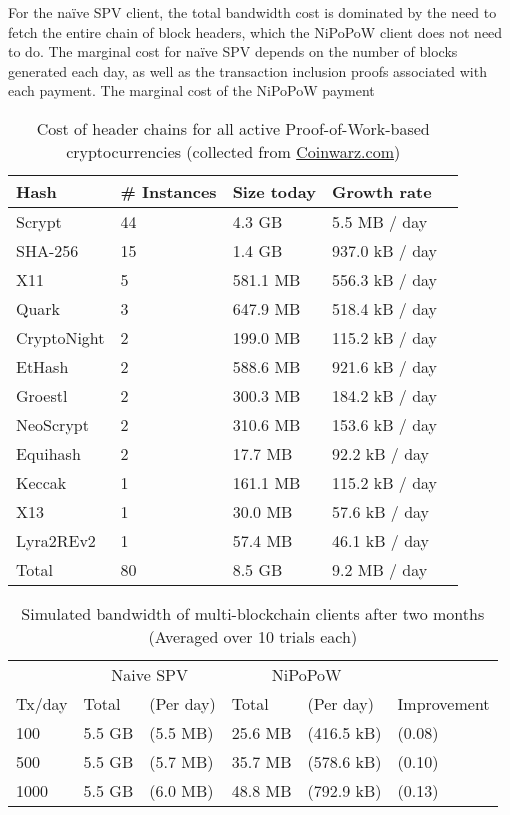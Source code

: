  For the na\"ive SPV client, the total bandwidth cost is dominated by the need to fetch the entire chain of block headers, which the NiPoPoW client does not need to do. The marginal cost for na\"ive SPV depends on the number of blocks generated each day, as well as the transaction inclusion proofs associated with each payment. The marginal cost of the NiPoPoW payment 

\begin{table}
  \caption{Cost of header chains for all active Proof-of-Work-based cryptocurrencies (collected from \url{Coinwarz.com})}
  \label{tbl:currencies}
\small
  \begin{tabular}{l|l|l|l}
    {\bf Hash} & {\bf \# Instances} & {\bf Size today} & {\bf Growth rate}  \\
    \hline
    Scrypt  & 44  & 4.3 GB  & 5.5 MB / day \  \\
    SHA-256  & 15  & 1.4 GB  & 937.0 kB / day \  \\
    X11  & 5  & 581.1 MB  & 556.3 kB / day \  \\
    Quark  & 3  & 647.9 MB  & 518.4 kB / day \  \\
    CryptoNight  & 2  & 199.0 MB  & 115.2 kB / day \  \\
    EtHash  & 2  & 588.6 MB  & 921.6 kB / day \  \\
    Groestl  & 2  & 300.3 MB  & 184.2 kB / day \  \\
    NeoScrypt  & 2  & 310.6 MB  & 153.6 kB / day \  \\
    Equihash  & 2  & 17.7 MB  & 92.2 kB / day \  \\
    Keccak  & 1  & 161.1 MB  & 115.2 kB / day \  \\
    X13  & 1  & 30.0 MB  & 57.6 kB / day \  \\
    Lyra2REv2  & 1  & 57.4 MB  & 46.1 kB / day \  \\
    \hline
    Total  & 80   &  8.5 GB  & 9.2 MB  / day  \\
  \end{tabular}
\end{table}



\begin{table}
  \caption{Simulated bandwidth of multi-blockchain clients after two months (Averaged over 10 trials each)}
  \small
  \begin{tabular}{l|ll|ll|l}
               & \multicolumn{2}{c|}{Naive SPV} & \multicolumn{2}{c|}{NiPoPoW} \\
    Tx/day & Total & (Per day) & Total & (Per day) & Improvement \\
    \hline
    100        & 5.5 GB          & (5.5 MB) & 25.6 MB & (416.5 kB) & (0.08) \\
    500        & 5.5 GB          & (5.7 MB) & 35.7 MB & (578.6 kB) & (0.10) \\
    1000       & 5.5 GB          & (6.0 MB) & 48.8 MB & (792.9 kB) & (0.13) \\
    \end{tabular}
  \end{table}

